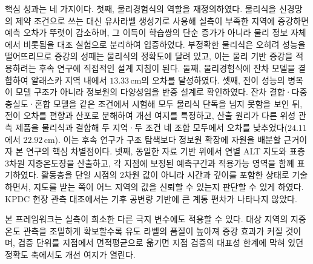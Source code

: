 \documentclass[10pt,twocolumn]{article}
\begin{document}
핵심 성과는 네 가지이다. 첫째, 물리경험식의 역할을 재정의하였다. 물리식을 신경망의 제약 조건으로 쓰는 대신 유사라벨 생성기로 사용해 실측이 부족한 지역에 증강하면 예측 오차가 뚜렷이 감소하며, 그 이득이 학습쌍의 단순 증가가 아니라 물리 정보 자체에서 비롯됨을 대조 실험으로 분리하여 입증하였다. 부정확한 물리식은 오히려 성능을 떨어뜨리므로 증강의 성패는 물리식의 정확도에 달려 있고, 이는 물리 기반 증강을 적용하려는 후속 연구에 직접적인 설계 지침이 된다. 둘째, 물리경험식에 잔차 모델을 결합하여 알래스카 지역 내에서 $13.33\,\mathrm{cm}$의 오차를 달성하였다. 셋째, 전이 성능의 병목이 모델 구조가 아니라 정보원의 다양성임을 반증 설계로 확인하였다. 잔차 결합·다중충실도·혼합 모델을 같은 조건에서 시험해 모두 물리식 단독을 넘지 못함을 보인 뒤, 전이 오차를 편향과 산포로 분해하여 개선 여지를 특정하고, 산출 원리가 다른 위성 관측 제품을 물리식과 결합해 두 지역·두 조건 네 조합 모두에서 오차를 낮추었다($24.11$에서 $22.92\,\mathrm{cm}$). 이는 후속 연구가 구조 탐색보다 정보원 확장에 자원을 배분할 근거이자 본 연구의 핵심 차별점이다. 넷째, 동일한 자료 기반 위에서 연별 ALT 지도와 표층 3차원 지중온도장을 산출하고, 각 지점에 보정된 예측구간과 적용가능 영역을 함께 표기하였다. 활동층을 단일 시점의 2차원 값이 아니라 시간과 깊이를 포함한 상태로 기술하면서, 지도를 받는 쪽이 어느 지역의 값을 신뢰할 수 있는지 판단할 수 있게 하였다. KPDC 현장 관측 대조에서는 기후 공변량 기반에 큰 계통 편차가 나타나지 않았다.

본 프레임워크는 실측이 희소한 다른 극지 변수에도 적용할 수 있다. 대상 지역의 지중온도 관측을 조밀하게 확보할수록 유도 라벨의 품질이 높아져 증강 효과가 커질 것이며, 검증 단위를 지점에서 면적평균으로 옮기면 지점 검증의 대표성 한계에 막혀 있던 정확도 축에서도 개선 여지가 열린다.

\end{document}
